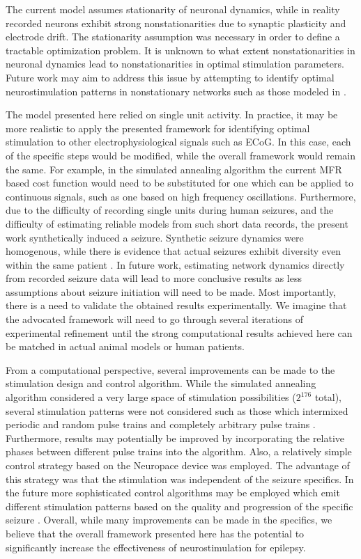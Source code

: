 \documentclass[journal,twoside,web]{ieeecolor}
\begin{document}
The current model assumes stationarity of neuronal dynamics, while in reality recorded neurons exhibit strong nonstationarities due to synaptic plasticity and electrode drift. 
The stationarity assumption was necessary in order to define a tractable optimization problem. 
It is unknown to what extent nonstationarities in neuronal dynamics lead to nonstationarities in optimal stimulation parameters. 
Future work may aim to address this issue by attempting to identify optimal neurostimulation patterns in nonstationary networks such as those modeled in \cite{robinson16}.

The model presented here relied on single unit activity.
In practice, it may be more realistic to apply the presented framework for identifying optimal stimulation to other electrophysiological signals such as ECoG.
In this case, each of the specific steps would be modified, while the overall framework would remain the same.
For example, in the simulated annealing algorithm the current MFR based cost function would need to be substituted for one which can be applied to continuous signals, such as one based on high frequency oscillations.
Furthermore, due to the difficulty of recording single units during human seizures, and the difficulty of estimating reliable models from such short data records, the present work synthetically induced a seizure.
Synthetic seizure dynamics were homogenous, while there is evidence that actual seizures exhibit diversity even within the same patient \cite{bower12,he14}. 
In future work, estimating network dynamics directly from recorded seizure data will lead to more conclusive results as less assumptions about seizure initiation will need to be made.
Most importantly, there is a need to validate the obtained results experimentally.
We imagine that the advocated framework will need to go through several iterations of experimental refinement until the strong computational results achieved here can be matched in actual animal models or human patients.

From a computational perspective, several improvements can be made to the stimulation design and control algorithm.
While the simulated annealing algorithm considered a very large space of stimulation possibilities ($2^{176}$ total), several stimulation patterns were not considered such as those which intermixed periodic and random pulse trains and completely arbitrary pulse trains \cite{grill14patent2,brocker17}.
Furthermore, results may potentially be improved by incorporating the relative phases between different pulse trains into the algorithm.
Also, a relatively simple control strategy based on the Neuropace device was employed.
The advantage of this strategy was that the stimulation was independent of the seizure specifics.
In the future more sophisticated control algorithms may be employed which emit different stimulation patterns based on the quality and progression of the specific seizure \cite{ching12,zalay13,kalitzin14,ehrens15}.
Overall, while many improvements can be made in the specifics, we believe that the overall framework presented here has the potential to significantly increase the effectiveness of neurostimulation for epilepsy.
\end{document}
